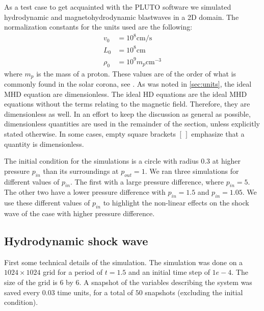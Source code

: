 As a test case to get acquainted with the PLUTO software we simulated hydrodynamic and magnetohydrodynamic blastwaves in a 2D domain.
The normalization constants for the units used are the following:
\begin{align*}
	v_0 &= 10^8 \text{cm/s}\\
	L_0 &= 10^8 \text{cm}\\
	\rho_0 &= 10^9 m_p \text{cm}^{-3}
\end{align*}
where $m_p$ is the mass of a proton. These values are of the order of what is commonly found in the solar corona, see \cite{article2}.
As was noted in \cref{sec:units}, the ideal MHD equation are dimensionless.
The ideal HD equations are the ideal MHD equations without the terms relating to the magnetic field. Therefore, they are dimensionless as well.
In an effort to keep the discussion as general as possible, dimensionless quantities are used in the remainder of the section, unless explicitly stated otherwise.
In some cases, empty square brackets $[\,]$ emphasize that a quantity is dimensionless.

The initial condition for the simulations is a circle with radius $0.3$ at higher pressure $p_{in}$ than its surroundings at $p_{out} = 1$.
We ran three simulations for different values of $p_{in}$.
The first with a large pressure difference, where $p_{in} = 5$. The other two have a lower pressure difference with $p_{in} = 1.5$ and  $p_{in}=1.05$.
We use these different values of $p_{in}$ to highlight the non-linear effects on the shock wave of the case with higher pressure difference.

\subsection{Hydrodynamic shock wave}
First some technical details of the simulation.
The simulation was done on a $1024 \times 1024$ grid for a period of $t=1.5$ and an initial time step of $1e-4$.
The size of the grid is $6$ by $6$.
A snapshot of the variables describing the system was saved every $0.03$ time units, for a total of $50$ snapshots (excluding the initial condition).

